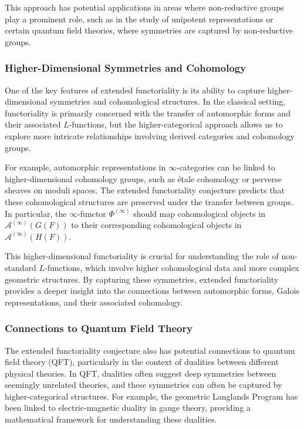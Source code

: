 \documentclass{article}
\theoremstyle{remark}
\begin{document}
This approach has potential applications in areas where non-reductive groups play a prominent role, such as in the study of unipotent representations or certain quantum field theories, where symmetries are captured by non-reductive groups.

\subsubsection{Higher-Dimensional Symmetries and Cohomology}

One of the key features of extended functoriality is its ability to capture higher-dimensional symmetries and cohomological structures. In the classical setting, functoriality is primarily concerned with the transfer of automorphic forms and their associated $L$-functions, but the higher-categorical approach allows us to explore more intricate relationships involving derived categories and cohomology groups.

For example, automorphic representations in $\infty$-categories can be linked to higher-dimensional cohomology groups, such as étale cohomology or perverse sheaves on moduli spaces. The extended functoriality conjecture predicts that these cohomological structures are preserved under the transfer between groups. In particular, the $\infty$-functor $\Phi^{(\infty)}$ should map cohomological objects in $\mathcal{A}^{(\infty)}(G(F))$ to their corresponding cohomological objects in $\mathcal{A}^{(\infty)}(H(F))$.

This higher-dimensional functoriality is crucial for understanding the role of non-standard $L$-functions, which involve higher cohomological data and more complex geometric structures. By capturing these symmetries, extended functoriality provides a deeper insight into the connections between automorphic forms, Galois representations, and their associated cohomology.

\subsubsection{Connections to Quantum Field Theory}

The extended functoriality conjecture also has potential connections to quantum field theory (QFT), particularly in the context of dualities between different physical theories. In QFT, dualities often suggest deep symmetries between seemingly unrelated theories, and these symmetries can often be captured by higher-categorical structures. For example, the geometric Langlands Program has been linked to electric-magnetic duality in gauge theory, providing a mathematical framework for understanding these dualities.
\end{document}

